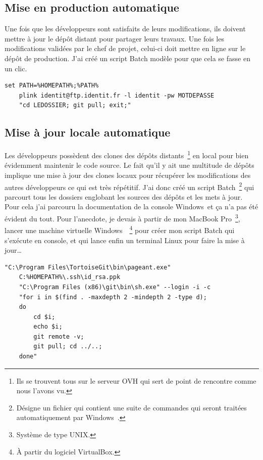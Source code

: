     \subsection{Mise en production automatique} %
    \label{sub:Mise en production automatique}

    Une fois que les développeurs sont satisfaits de leurs modifications,
    ils doivent mettre à jour le dépôt distant pour partager leurs travaux.
    Une fois les modifications validées par le chef de projet, celui-ci doit
    mettre en ligne sur le dépôt de production. J'ai créé un script Batch
    \og modèle \fg{} pour que cela se fasse en un clic.\\

    \begin{lstlisting}[basicstyle=\ttfamily\small, frame=trBL]
    set PATH=%HOMEPATH%;%PATH%
    plink identit@ftp.identit.fr -l identit -pw MOTDEPASSE
    "cd LEDOSSIER; git pull; exit;"
    \end{lstlisting}

    \subsection{Mise à jour locale automatique} %
    \label{sub:Mise à jour locale automatique}

    Les développeurs possèdent des clones des dépôts distants\,
    \footnote{Ils se trouvent tous sur le serveur OVH qui sert de point de
    rencontre comme nous l'avons vu.} en local pour bien évidemment
    maintenir le code source. Le fait qu'il y ait une multitude de dépôts
    implique une mise à jour des clones locaux pour récupérer les
    modifications des autres développeurs ce qui est très répétitif. J'ai
    donc créé un script Batch\, \footnote{Désigne un fichier qui contient
    une suite de commandes qui seront traitées automatiquement par
    Windows~\textregistered.} qui parcourt tous les dossiers englobant les
    sources des dépôts et les mets à jour. Pour cela j'ai parcouru la
    documentation de la console Windows~\textregistered et ça n'a pas été
    évident du tout. Pour l'anecdote, je devais à partir de mon MacBook
    Pro\, \footnote{Système de type UNIX.}, lancer une machine virtuelle
    Windows~\textregistered\, \footnote{À partir du logiciel VirtualBox.}
    pour créer mon script Batch qui s'exécute en console, et qui lance enfin
    un terminal Linux pour faire la mise à jour\dots\\

    \begin{lstlisting}[basicstyle=\ttfamily\small, frame=trBL]
    "C:\Program Files\TortoiseGit\bin\pageant.exe"
    C:%HOMEPATH%\.ssh\id_rsa.ppk
    "C:\Program Files (x86)\git\bin\sh.exe" --login -i -c
    "for i in $(find . -maxdepth 2 -mindepth 2 -type d);
    do
        cd $i;
        echo $i;
        git remote -v;
        git pull; cd ../..;
    done"
    \end{lstlisting}

